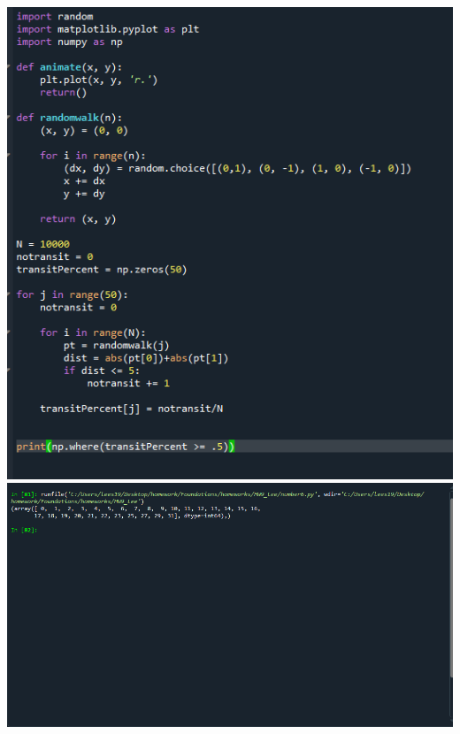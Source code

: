 \documentclass[10pt,letterpaper]{article}
\begin{document}
\begin{enumerate}
\includegraphics{number6.png}\\
\includegraphics[scale = .7]{number6b.png}

\end{enumerate}
\end{document}
